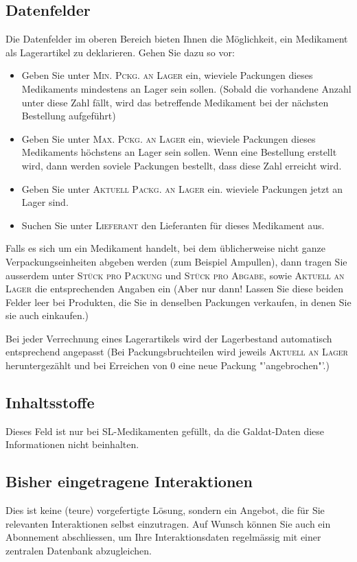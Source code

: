 \documentclass[a4paper]{scrartcl}
\begin{document}
\subsection{Datenfelder}
Die Datenfelder im oberen Bereich bieten Ihnen die Möglichkeit, ein Medikament als Lagerartikel zu deklarieren. Gehen Sie dazu so vor:
\begin{itemize}
\item Geben Sie unter \textsc{Min. Pckg. an Lager} ein, wieviele Packungen dieses Medikaments mindestens an Lager sein sollen. (Sobald die vorhandene Anzahl unter diese Zahl fällt, wird das betreffende Medikament bei der nächsten Bestellung aufgeführt)
\item Geben Sie unter \textsc{Max. Pckg. an Lager} ein, wieviele Packungen dieses Medikaments höchstens an Lager sein sollen. Wenn eine Bestellung erstellt wird, dann werden soviele Packungen bestellt, dass diese Zahl erreicht wird.
\item Geben Sie unter \textsc{Aktuell Packg. an Lager} ein. wieviele Packungen jetzt an Lager sind.
\item Suchen Sie unter \textsc{Lieferant} den Lieferanten für dieses Medikament aus.
\end{itemize}
Falls es sich um ein Medikament handelt, bei dem üblicherweise nicht ganze Verpackungseinheiten abgeben werden (zum Beispiel Ampullen), dann tragen Sie ausserdem unter \textsc{Stück pro Packung} und \textsc{Stück pro Abgabe}, sowie \textsc{Aktuell an Lager} die entsprechenden Angaben ein (Aber nur dann! Lassen Sie diese beiden Felder leer bei Produkten, die Sie in denselben Packungen verkaufen, in denen Sie sie auch einkaufen.)

\bigskip
Bei jeder Verrechnung eines Lagerartikels wird der Lagerbestand automatisch entsprechend  angepasst (Bei Packungsbruchteilen wird jeweils \textsc{Aktuell an Lager} heruntergezählt und bei Erreichen von 0 eine neue Packung "'angebrochen"'.)

\subsection{Inhaltsstoffe}
Dieses Feld ist nur bei SL-Medikamenten gefüllt, da die Galdat-Daten diese Informationen nicht beinhalten.

\subsection{Bisher eingetragene Interaktionen}
Dies ist keine (teure) vorgefertigte Lösung, sondern ein Angebot, die für Sie relevanten Interaktionen selbst einzutragen. Auf Wunsch können Sie auch ein Abonnement abschliessen, um Ihre Interaktionsdaten regelmässig mit einer zentralen Datenbank abzugleichen.
\end{document}
